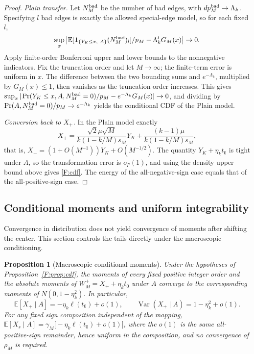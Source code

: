 \documentclass[a4paper,11pt]{article}
\newtheorem{proposition}[theorem]{Proposition}
\numberwithin{equation}{section}
\newcommand{\E}{\mathbb E}
\newcommand{\Var}{\operatorname{Var}}
\begin{document}
\begin{proof}
\emph{Plain transfer.} Let $N^{\rm bad}_M$ be the number of bad edges, with $dp_M^{\rm bad}\to\Lambda_k$.
Specifying $l$ bad edges is exactly the allowed special-edge model, so for each fixed $l$,
\[
\sup_x\left|\E[\mathbf1_{\{Y_K\le x,\ A\}}(N^{\rm bad}_M)_l]/p_M-\Lambda_k^lG_M(x)\right|\to0.
\]
Apply finite-order Bonferroni upper and lower bounds to the nonnegative indicators. Fix the truncation order
and let $M\to\infty$; the finite-term error is uniform in $x$. The difference between the two bounding sums and
$e^{-\Lambda_k}$, multiplied by $G_M(x)\le1$, then vanishes as the truncation order increases. This gives
$\sup_x|\Pr(Y_K\le x,A,N^{\rm bad}_M=0)/p_M-e^{-\Lambda_k}G_M(x)|\to0$, and dividing by
$\Pr(A,N^{\rm bad}_M=0)/p_M\to e^{-\Lambda_k}$ yields the conditional CDF of the Plain model.

\emph{Conversion back to $X_+$.} In the Plain model exactly
\begin{equation}
X_+=\frac{\sqrt2\mu\sqrt M}{k(1-k/M)s_M}Y_K+\frac{(k-1)\mu}{k(1-k/M)s_M},\label{F:affine}
\end{equation}
that is, $X_+=(1+O(M^{-1}))Y_K+O(M^{-1/2})$. The quantity $Y_K+\eta_kt_0$ is tight under $A$, so the
transformation error is $o_P(1)$, and using the density upper bound above gives \eqref{F:cdf}. The energy of
the all-negative-sign case equals that of the all-positive-sign case.
\end{proof}

\subsection{Conditional moments and uniform integrability}

Convergence in distribution does not yield convergence of moments after shifting the center. This section
controls the tails directly under the macroscopic conditioning.

\begin{proposition}[Macroscopic conditional moments]\label{F:prop:moments}
Under the hypotheses of Proposition~\ref{F:prop:cdf}, the moments of every fixed positive integer order and the
absolute moments of $W^+_M=X_++\eta_kt_0$ under $A$ converge to the corresponding moments of
$N(0,1-\eta_k^2)$. In particular,
\begin{equation}
\E[X_+\mid A]=-\eta_k\ell(t_0)+o(1),\qquad\Var(X_+\mid A)=1-\eta_k^2+o(1).\label{F:moments}
\end{equation}
For any fixed sign composition independent of the mapping,
$\E[X_s\mid A]=\gamma_M\bigl[-\eta_k\ell(t_0)+o(1)\bigr]$, where the $o(1)$ is the same all-positive-sign
remainder, hence uniform in the composition, and no convergence of $\rho_M$ is required.
\end{proposition}
\end{document}
